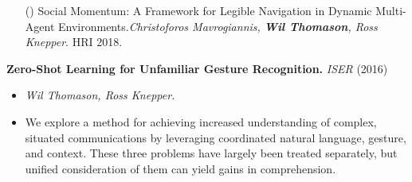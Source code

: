 \documentclass[10pt]{article}
\makeatletter
\newenvironment{innerlist}[1][\enskip\textbullet]%
{\begin{itemize}[#1,leftmargin=*,parsep=0pt,itemsep=0pt,topsep=0pt,partopsep=0pt]}
		{\end{itemize}}
\newcounter{cpublications}
\newcommand{\ifnonempty}[2]{\@ifnotmtarg{#1}{#2}}
\newenvironment{confpub}[5][]{\addtocounter{cpublicationsTot}{1}\addtocounter{cpublications}{-1}\setlength{\parskip}{0pt}%
	\begin{itemize}[leftmargin=*,labelindent=0pt,nolistsep]%
		\setlength{\parskip}{0pt}%
		\item[(\thecpublications)]{#2}.\linebreak[0]\emph{#3}. #4 #5\ifnonempty{#1}{, #1}.%
	\end{itemize}}{}
\makeatother
\begin{document}

\begin{confpub}{Social Momentum: A Framework for Legible Navigation in Dynamic Multi-Agent
		Environments}{Christoforos Mavrogiannis, \textbf{Wil Thomason}, Ross Knepper}{HRI}{2018}
\end{confpub}


\textbf{Zero-Shot Learning for Unfamiliar Gesture Recognition.}
\emph{ISER} (2016)
\begin{innerlist}
	\item[] \emph{Wil Thomason, Ross Knepper.}
	\item[] We explore a method for achieving increased understanding of complex, situated
	communications by leveraging coordinated natural language, gesture, and context. These three
	problems have largely been treated separately, but unified consideration of them can yield
	gains in comprehension.
\end{innerlist}\bigskip
\end{document}
